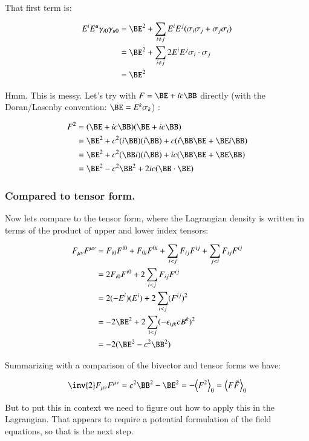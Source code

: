 \documentclass{article}
\newcommand{\gpgrade}[2] {{\left\langle{{#1}}\right\rangle}_{#2}}
\newcommand{\gpgradezero}[1] {\gpgrade{#1}{0}}
\begin{document}
That first term is:

\begin{align*}
E^i E^u \gamma_{i 0} \gamma_{u 0}
&= \BE^2 + \sum_{i \ne j} E^i E^j ( \sigma_i \sigma_j + \sigma_j \sigma_i ) \\
&= \BE^2 + \sum_{i \ne j} 2 E^i E^j \sigma_i \cdot \sigma_j \\
&= \BE^2
\end{align*}

Hmm.  This is messy.  Let's try with $F = \BE + i c \BB$ directly (with the Doran/Lasenby convention: $\BE = E^k \sigma_k$) :

\begin{align*}
F^2
&= (\BE + i c \BB) (\BE + i c \BB) \\
&= \BE^2 + c^2 (i \BB) (i \BB) + c (i \BB \BE + \BE i \BB) \\
&= \BE^2 + c^2 (\BB i) (i \BB) + i c (\BB \BE + \BE \BB) \\
&= \BE^2 - c^2 \BB^2 + 2 i c (\BB \cdot \BE) \\
\end{align*}

\subsubsection{ Compared to tensor form. }

Now lets compare to the tensor form, where the Lagrangian density is written in terms of the product of upper and lower index tensors:

\begin{align*}
F_{\mu\nu}F^{\mu\nu}
&= F_{i 0}F^{i 0} +F_{0 i}F^{0 i} +\sum_{i<j} F_{i j}F^{i j} +\sum_{j<i} F_{i j}F^{i j} \\
&= 2 F_{i 0}F^{i 0} + 2 \sum_{i<j} F_{i j}F^{i j} \\
&= 2 (-E^i)(E^i) + 2 \sum_{i<j} (F^{i j})^2 \\
&= -2 \BE^2 + 2 \sum_{i<j} ( -\epsilon_{ijk} c B^k )^2 \\
&= -2 ( \BE^2 - c^2 \BB^2 )
\end{align*}

Summarizing with a comparison of the bivector and tensor forms we have:

\begin{equation}
\inv{2} F_{\mu\nu}F^{\mu\nu} = c^2 \BB^2 - \BE^2 = - \gpgradezero{F^2} = \gpgradezero{ F \tilde{F} }
\end{equation}

But to put this in context we need to figure out how to apply this in the Lagrangian.  That appears to require a potential formulation of the field equations, so that is the next step.
\end{document}
